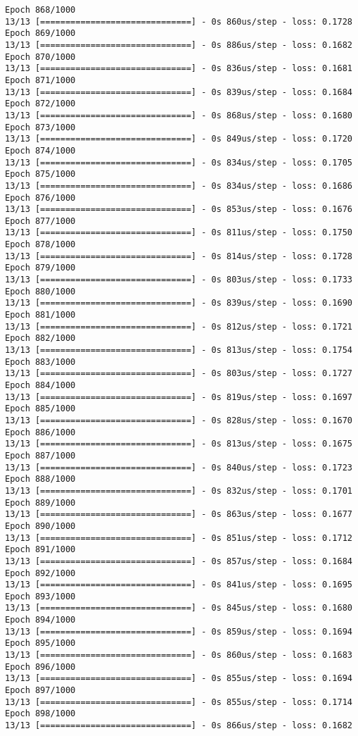 \documentclass[11pt]{article}
\begin{document}
\begin{Verbatim}[commandchars=\\\{\}]
Epoch 868/1000
13/13 [==============================] - 0s 860us/step - loss: 0.1728
Epoch 869/1000
13/13 [==============================] - 0s 886us/step - loss: 0.1682
Epoch 870/1000
13/13 [==============================] - 0s 836us/step - loss: 0.1681
Epoch 871/1000
13/13 [==============================] - 0s 839us/step - loss: 0.1684
Epoch 872/1000
13/13 [==============================] - 0s 868us/step - loss: 0.1680
Epoch 873/1000
13/13 [==============================] - 0s 849us/step - loss: 0.1720
Epoch 874/1000
13/13 [==============================] - 0s 834us/step - loss: 0.1705
Epoch 875/1000
13/13 [==============================] - 0s 834us/step - loss: 0.1686
Epoch 876/1000
13/13 [==============================] - 0s 853us/step - loss: 0.1676
Epoch 877/1000
13/13 [==============================] - 0s 811us/step - loss: 0.1750
Epoch 878/1000
13/13 [==============================] - 0s 814us/step - loss: 0.1728
Epoch 879/1000
13/13 [==============================] - 0s 803us/step - loss: 0.1733
Epoch 880/1000
13/13 [==============================] - 0s 839us/step - loss: 0.1690
Epoch 881/1000
13/13 [==============================] - 0s 812us/step - loss: 0.1721
Epoch 882/1000
13/13 [==============================] - 0s 813us/step - loss: 0.1754
Epoch 883/1000
13/13 [==============================] - 0s 803us/step - loss: 0.1727
Epoch 884/1000
13/13 [==============================] - 0s 819us/step - loss: 0.1697
Epoch 885/1000
13/13 [==============================] - 0s 828us/step - loss: 0.1670
Epoch 886/1000
13/13 [==============================] - 0s 813us/step - loss: 0.1675
Epoch 887/1000
13/13 [==============================] - 0s 840us/step - loss: 0.1723
Epoch 888/1000
13/13 [==============================] - 0s 832us/step - loss: 0.1701
Epoch 889/1000
13/13 [==============================] - 0s 863us/step - loss: 0.1677
Epoch 890/1000
13/13 [==============================] - 0s 851us/step - loss: 0.1712
Epoch 891/1000
13/13 [==============================] - 0s 857us/step - loss: 0.1684
Epoch 892/1000
13/13 [==============================] - 0s 841us/step - loss: 0.1695
Epoch 893/1000
13/13 [==============================] - 0s 845us/step - loss: 0.1680
Epoch 894/1000
13/13 [==============================] - 0s 859us/step - loss: 0.1694
Epoch 895/1000
13/13 [==============================] - 0s 860us/step - loss: 0.1683
Epoch 896/1000
13/13 [==============================] - 0s 855us/step - loss: 0.1694
Epoch 897/1000
13/13 [==============================] - 0s 855us/step - loss: 0.1714
Epoch 898/1000
13/13 [==============================] - 0s 866us/step - loss: 0.1682

\end{Verbatim}
\end{document}
